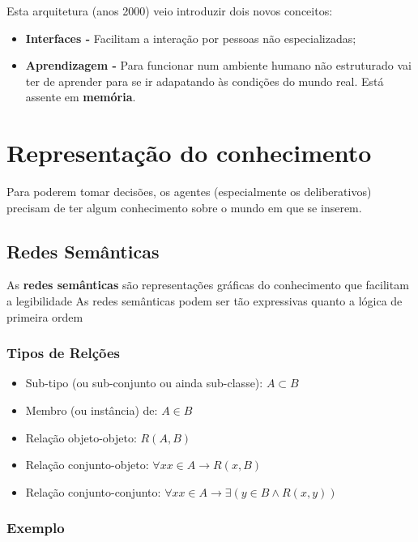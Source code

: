 \documentclass{article}
\begin{document}
Esta arquitetura (anos 2000) veio introduzir dois novos conceitos:

\begin{itemize}
  \item \textbf{Interfaces -} Facilitam a interação por pessoas não especializadas;
  \item \textbf{Aprendizagem -} Para funcionar num ambiente humano não estruturado vai ter de aprender para se ir
  adapatando às condições do mundo real. Está assente em \textbf{memória}.
\end{itemize}

\section{Representação do conhecimento}

Para poderem tomar decisões, os agentes (especialmente os deliberativos) precisam de ter
algum conhecimento sobre o mundo em que se inserem.

\subsection{Redes Semânticas}

As \textbf{redes semânticas} são representações gráficas do conhecimento que facilitam a legibilidade
As redes semânticas podem ser tão expressivas quanto
a lógica de primeira ordem

\pagebreak

\subsubsection{Tipos de Relções}

\begin{itemize}
  \item Sub-tipo (ou sub-conjunto ou ainda sub-classe): $A \subset B$
  \item Membro (ou instância) de: $A \in B$
  \item Relação objeto-objeto: $R(A, B)$
  \item Relação conjunto-objeto: $\forall x x \in A \rightarrow R(x, B)$
  \item Relação conjunto-conjunto: $\forall x x \in A \rightarrow \exists (y \in B \wedge R(x, y))$
\end{itemize}

\subsubsection{Exemplo}
\end{document}

